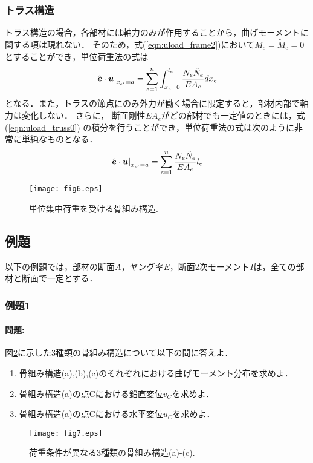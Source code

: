\documentclass[10pt,a4j]{jarticle}
\begin{document}
\subsubsection{トラス構造}
トラス構造の場合，各部材には軸力のみが作用することから，曲げモーメントに関する項は現れない．
そのため，式(\ref{eqn:uload_frame2})において$M_e=\tilde M_e=0$とすることができ，単位荷重法の式は
\begin{equation}
	\left.
	\hat{\mbox{\boldmath $e$}}\cdot \mbox{\boldmath $u$}
	\right|_{x_{e'}=a}
	=
	\sum_{e=1}^n 
	\int_{x_e=0}^{l_e} 
	\frac{N_e \tilde N_e}{EA_e}
	dx_e
	\label{eqn:uload_truss0}
\end{equation}
となる．また，トラスの節点にのみ外力が働く場合に限定すると，部材内部で軸力は変化しない．
さらに， 断面剛性$EA_e$がどの部材でも一定値のときには，式(\ref{eqn:uload_truss0})
の積分を行うことができ，単位荷重法の式は次のように非常に単純なものとなる．
\begin{equation}
	\left.
	\hat{\mbox{\boldmath $e$}}\cdot \mbox{\boldmath $u$}
	\right|_{x_{e'}=a}
	=
	\sum_{e=1}^n 
	\frac{N_e \tilde N_e}{EA_e}l_e
	\label{eqn:uload_truss}
\end{equation}
\begin{figure}
	\begin{center}
	\texttt{[image: fig6.eps]} 
	\end{center}
	\caption{単位集中荷重を受ける骨組み構造.} 
	\label{fig:fig6}
\end{figure}
\subsection{例題}
以下の例題では，部材の断面$A$，ヤング率$E$，断面2次モーメント$I$は，全ての部材と断面で一定とする．
\subsubsection{例題1}
\paragraph{問題:}
図\ref{fig:fig7}に示した3種類の骨組み構造について以下の問に答えよ．
\begin{enumerate}
\item
	骨組み構造(a),(b),(c)のそれぞれにおける曲げモーメント分布を求めよ．
\item
	骨組み構造(a)の点Cにおける鉛直変位$v_C$を求めよ．
\item
	骨組み構造(a)の点Cにおける水平変位$u_C$を求めよ．
\end{enumerate}
\begin{figure}
	\begin{center}
	\texttt{[image: fig7.eps]} 
	\end{center}
	\caption{荷重条件が異なる3種類の骨組み構造(a)-(c).}
	\label{fig:fig7}
\end{figure}
\end{document}
